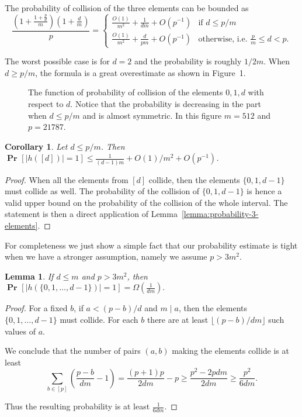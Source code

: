 \documentclass{article}
\newcommand{\probs}[2]{\operatorname{\mathbf{Pr}}_{{#1}}\left[{#2}\right]}
\newcommand{\prob}[1]{\probs{}{#1}}
\newtheorem{lemma}{Lemma}
\newtheorem{corollary}{Corollary}
\begin{document}
The probability of collision of the three elements can be bounded as
\[
\frac{\left(1 + \frac{1 + \frac{p}{d}}{m}\right)\left(1 + \frac{d}{m}\right)}{p} =
\begin{cases}
	\frac{O(1)}{m^2} + \frac{1}{dm} + O\left(p^{-1}\right) & \mbox{if } d \leq p/m \\
	\frac{O(1)}{m^2} + \frac{d}{pm} + O\left(p^{-1}\right) & \mbox{otherwise, i.e. } \frac{p}{m} \leq d < p.
\end{cases}
\]

The worst possible case is for $d = 2$ and the probability is roughly $1/2m$. 
When $d \geq p/m$, the formula is a great overestimate as shown in Figure~1.

\begin{figure}[h]
	\label{fig:probability-3}
	\centering
	\caption{The function of probability of collision of the elements $0, 1, d$ with respect to $d$. Notice that the probability is decreasing in the part when $d \leq p / m$ and is almost symmetric. In this figure $m = 512$ and $p = 21787$.}
\end{figure}

\begin{corollary}
\label{co:d-elements}
Let $d \leq p / m$. Then $\prob{|h([d])| = 1} \leq \frac{1}{(d - 1) m} + O(1)/m^2 + O(p^{-1})$.
\end{corollary}
\begin{proof}
When all the elements from $[d]$ collide, then the elements $\{0, 1, d - 1\}$ must collide as well. The probability of the collision of $\{0, 1, d - 1\}$ is hence a valid upper bound on the probability of the collision of the whole interval. The statement is then a direct application of Lemma~\ref{lemma:probability-3-elements}.
\end{proof}

For completeness we just show a simple fact that our probability estimate is tight when we have a stronger assumption, namely we assume $p > 3m^2$.

\begin{lemma}
\label{lm:0-d-prob-lower-bound}
If $d \leq m$ and $p > 3m^2$, then $\prob{|h(\{0, 1, \ldots, d - 1\})| = 1} = \Omega\left(\frac{1}{dm}\right).$
\end{lemma}
\begin{proof}
For a fixed $b$, if $a < (p - b)/d$ and $m \mid a$, then the elements $\{0, 1, \ldots, d - 1\}$ must collide.
For each $b$ there are at least $\lfloor (p - b)/dm \rfloor$ such values of $a$.

We conclude that the number of pairs $(a, b)$ making the elements collide is at least
\[
\sum_{b \in [p]} \left(\frac{p - b}{dm} - 1\right) = \frac{(p + 1)p}{2dm} - p \geq \frac{p ^ 2 - 2pdm}{2dm} \geq \frac{p^2}{6dm}.
\]

Thus the resulting probability is at least $\frac{1}{6dm}$.
\end{proof}
\end{document}
